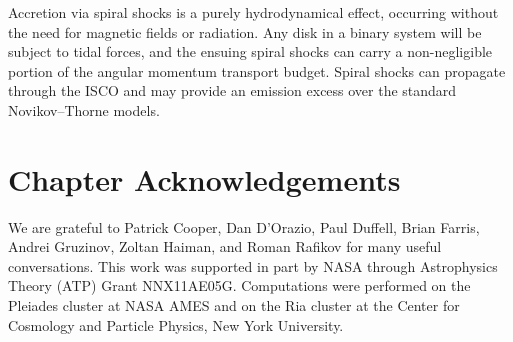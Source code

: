 Accretion via spiral shocks is a purely hydrodynamical effect, occurring without the need for magnetic fields or radiation.  Any disk in a binary system will be subject to tidal forces, and the ensuing spiral shocks can carry a non-negligible portion of the angular momentum transport budget.  Spiral shocks can propagate through the ISCO and may provide an emission excess over the standard Novikov--Thorne models.

\section{Chapter Acknowledgements} 
We are grateful to Patrick Cooper, Dan D'Orazio, Paul Duffell, Brian Farris, Andrei Gruzinov, Zoltan Haiman, and Roman Rafikov for many useful conversations.  This work was supported in part by NASA through Astrophysics Theory (ATP) Grant NNX11AE05G.  Computations were performed on the Pleiades cluster at NASA AMES and on the Ria cluster at the Center for Cosmology and Particle Physics, New York University.